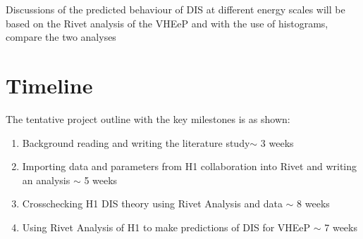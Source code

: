 \documentclass[journal, a4paper,11pt]{IEEEtran}
\begin{document}
Discussions of the predicted behaviour of DIS at different energy scales will be based on the Rivet analysis of the VHEeP and with the use of histograms, compare the two analyses

\section{Timeline}
\noindent The tentative project outline with the key milestones is as shown:
\begin{enumerate}
	\item Background reading and writing the literature study$\sim$ 3 weeks

	\item Importing data and parameters from H1 collaboration into Rivet and writing an analysis $\sim$ 5 weeks

	\item Crosschecking H1 DIS theory using Rivet Analysis and data $\sim$ 8 weeks

	\item Using Rivet Analysis of H1 to make predictions of DIS for VHEeP $\sim$ 7 weeks 

\end{enumerate}



\end{document}
